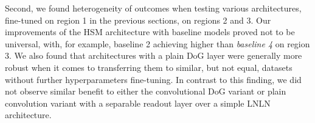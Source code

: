 Second, we found heterogeneity of outcomes when testing various architectures, fine-tuned on region 1 in the previous sections, on regions 2 and 3. Our improvements of the HSM architecture with baseline models proved not to be universal, with, for example, baseline 2 achieving higher than \textit{baseline 4} on region 3. We also found that architectures with a plain DoG layer were generally more robust when it comes to transferring them to similar, but not equal, datasets without further hyperparameters fine-tuning. In contrast to this finding, we did not observe similar benefit to either the convolutional DoG variant or plain convolution variant with a separable readout layer over a simple LNLN architecture.

\setlength{\abovecaptionskip}{10pt plus 0pt minus 0pt} %